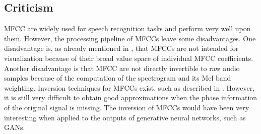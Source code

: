 
\subsection{Criticism}
MFCC are widely used for speech recognition tasks and perform very well upon them. 
However, the processing pipeline of MFCCs leave some disadvantages.
One disadvantage is, as already mentioned in , that MFCCs are not intended for visualization because of their broad value space of individual MFCC coefficients.
Another disadvantage is that MFCC are not directly invertible to raw audio samples because of the computation of the spectrogram and its Mel band weighting.
Inversion techniques for MFCCs exist, such as described in \cite{Boucheron2008}.
However, it is still very difficult to obtain good approximations when the phase information of the original signal is missing.
The inversion of MFCCs would have been very interesting when applied to the outputs of generative neural networks, such as GANs.